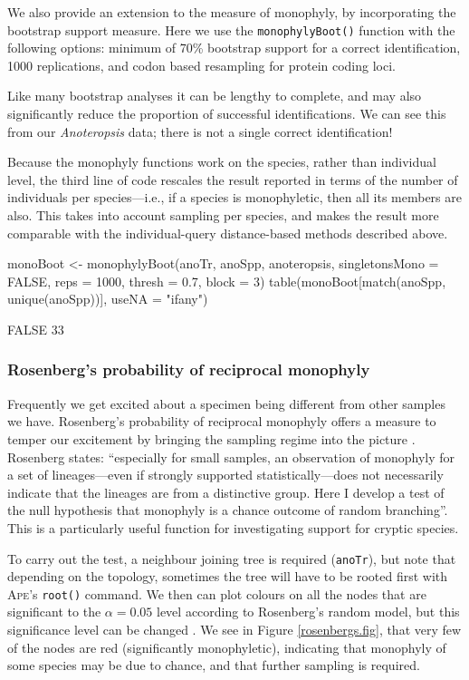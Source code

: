 \documentclass{article}
\newcommand{\progname}[1]{\textsc{#1}}
\newcommand{\fun}[1]{\texttt{#1}}
\begin{document}
We also provide an extension to the measure of monophyly, by incorporating the bootstrap support measure. Here we use the \fun{monophylyBoot()} function with the following options: minimum of 70\% bootstrap support for a correct identification, 1000 replications, and codon based resampling for protein coding loci. 

Like many bootstrap analyses it can be lengthy to complete, and may also significantly reduce the proportion of successful identifications. We can see this from our \emph{Anoteropsis} data; there is not a single correct identification!

Because the monophyly functions work on the species, rather than individual level, the third line of code rescales the result reported in terms of the number of individuals per species---i.e., if a species is monophyletic, then all its members are also. This takes into account sampling per species, and makes the result more comparable with the individual-query distance-based methods described above.

\begin{console}
monoBoot <- monophylyBoot(anoTr, anoSpp, anoteropsis, 
singletonsMono = FALSE, reps = 1000, thresh = 0.7, block = 3)
table(monoBoot[match(anoSpp, unique(anoSpp))], useNA = "ifany")
\end{console}

\begin{Routput}
FALSE 
   33
\end{Routput}

\subsubsection{Rosenberg's probability of reciprocal monophyly}
Frequently we get excited about a specimen being different from other samples we have. Rosenberg's probability of reciprocal monophyly offers a measure to temper our excitement by bringing the sampling regime into the picture \citep{Rosenberg2007}. Rosenberg states: ``especially for small samples, an observation of monophyly for a set of lineages---even if strongly supported statistically---does not necessarily indicate that the lineages are from a distinctive group. Here I develop a test of the null hypothesis that monophyly is a chance outcome of random branching''. This is a particularly useful function for investigating support for cryptic species.

To carry out the test, a neighbour joining tree is required (\fun{anoTr}), but note that depending on the topology, sometimes the tree will have to be rooted first with \progname{Ape}'s \fun{root()} command. We then can plot colours on all the nodes that are significant to the $\alpha = 0.05$ level according to Rosenberg's random model, but this significance level can be changed \citep{Rosenberg2007}. We see in Figure \ref{rosenbergs.fig}, that very few of the nodes are red (significantly monophyletic), indicating that monophyly of some species may be due to chance, and that further sampling is required. 
\end{document}
